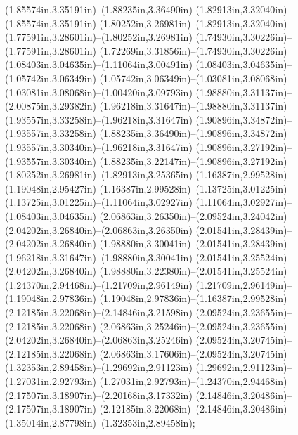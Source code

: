 (1.85574in,3.35191in)--(1.88235in,3.36490in) (1.82913in,3.32040in)--(1.85574in,3.35191in) (1.80252in,3.26981in)--(1.82913in,3.32040in) (1.77591in,3.28601in)--(1.80252in,3.26981in) (1.74930in,3.30226in)--(1.77591in,3.28601in) (1.72269in,3.31856in)--(1.74930in,3.30226in) (1.08403in,3.04635in)--(1.11064in,3.00491in) (1.08403in,3.04635in)--(1.05742in,3.06349in) (1.05742in,3.06349in)--(1.03081in,3.08068in) (1.03081in,3.08068in)--(1.00420in,3.09793in) (1.98880in,3.31137in)--(2.00875in,3.29382in) (1.96218in,3.31647in)--(1.98880in,3.31137in) (1.93557in,3.33258in)--(1.96218in,3.31647in) (1.90896in,3.34872in)--(1.93557in,3.33258in) (1.88235in,3.36490in)--(1.90896in,3.34872in) (1.93557in,3.30340in)--(1.96218in,3.31647in) (1.90896in,3.27192in)--(1.93557in,3.30340in) (1.88235in,3.22147in)--(1.90896in,3.27192in) (1.80252in,3.26981in)--(1.82913in,3.25365in) (1.16387in,2.99528in)--(1.19048in,2.95427in) (1.16387in,2.99528in)--(1.13725in,3.01225in) (1.13725in,3.01225in)--(1.11064in,3.02927in) (1.11064in,3.02927in)--(1.08403in,3.04635in) (2.06863in,3.26350in)--(2.09524in,3.24042in) (2.04202in,3.26840in)--(2.06863in,3.26350in) (2.01541in,3.28439in)--(2.04202in,3.26840in) (1.98880in,3.30041in)--(2.01541in,3.28439in) (1.96218in,3.31647in)--(1.98880in,3.30041in) (2.01541in,3.25524in)--(2.04202in,3.26840in) (1.98880in,3.22380in)--(2.01541in,3.25524in) (1.24370in,2.94468in)--(1.21709in,2.96149in) (1.21709in,2.96149in)--(1.19048in,2.97836in) (1.19048in,2.97836in)--(1.16387in,2.99528in) (2.12185in,3.22068in)--(2.14846in,3.21598in) (2.09524in,3.23655in)--(2.12185in,3.22068in) (2.06863in,3.25246in)--(2.09524in,3.23655in) (2.04202in,3.26840in)--(2.06863in,3.25246in) (2.09524in,3.20745in)--(2.12185in,3.22068in) (2.06863in,3.17606in)--(2.09524in,3.20745in) (1.32353in,2.89458in)--(1.29692in,2.91123in) (1.29692in,2.91123in)--(1.27031in,2.92793in) (1.27031in,2.92793in)--(1.24370in,2.94468in) (2.17507in,3.18907in)--(2.20168in,3.17332in) (2.14846in,3.20486in)--(2.17507in,3.18907in) (2.12185in,3.22068in)--(2.14846in,3.20486in) (1.35014in,2.87798in)--(1.32353in,2.89458in);
